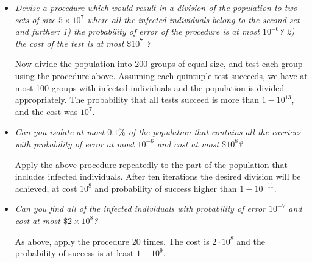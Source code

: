 \documentclass[11pt]{article} \usepackage{amssymb}
\begin{document}
\begin{itemize}
\item
{\em Devise a procedure which would result in a division of the population to two sets of size $5 \times 10^7$ where all the infected individuals belong to the second set and further: 1) the probability of error of the
procedure is at most $10^{-6}$? 2) the cost of the test is at most $\$  10^7 $ ?
}

Now divide the population into 200 groups of equal size, and test each group 
using the procedure above. Assuming each quintuple test succeeds, we have at
most 100 groups with infected individuals and the population is divided 
appropriately. The probability that all tests succeed is more than 
$1-10^{13}$, and the cost was $10^7$.

\item
{\em Can you isolate at most $0.1\%$ of the population that contains all the carriers with probability of error at most $10^{-6}$
and cost at most $\$ 10^{8}$?
}

Apply the above procedure repeatedly to the part of the population that includes
infected individuals. After ten iterations the desired division will be
achieved, at cost $10^8$ and probability of success higher than $1-10^{-11}$.

\item
{\em Can you find all of the infected individuals with probability of error
$10^{-7}$
and cost at most $\$2 \times 10^{8}$?
}

As above, apply the procedure 20 times. The cost is $2\cdot 10^8$ and 
the probability of success is at least $1-10^9$.

\end{itemize}
\end{document}

